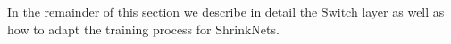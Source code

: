 In the remainder of this section we describe in detail the Switch layer as well
as how to adapt the training process for ShrinkNets.



%
%




